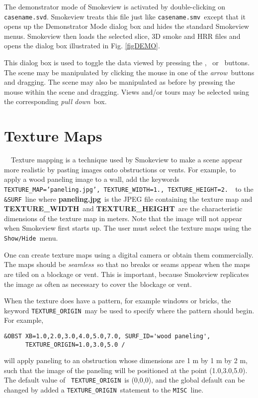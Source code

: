 \documentclass[11pt,twoside]{book}
\newcommand{\frameit}[1]{\fbox{\tt #1}}
\begin{document}
The demonstrator mode of Smokeview is activated by double-clicking on {\tt casename.svd}.
Smokeview treats this file just like {\tt casename.smv}\ except that it opens up
the Demonstrator Mode dialog box and hides the standard Smokeview menus.
Smokeview then
loads the selected slice, 3D smoke and HRR files and opens the dialog box illustrated in
Fig. \ref{figDEMO}.

This dialog box is used to toggle the data viewed by pressing the
\frameit{Smoke/Fire}, \frameit{Temperature}\ or \frameit{Oxygen}\
buttons. The scene may be manipulated by clicking the mouse in one
of the {\em arrow}\ buttons and dragging.  The scene may also be
manipulated as before by pressing the mouse within the scene and
dragging. Views and/or tours may be selected using the
corresponding {\em pull down}\ box.


\chapter{Texture Maps}\ \label{chapter:texturemaps}\ Texture mapping is a technique used by
Smokeview to make a scene appear more realistic by pasting images
onto obstructions or vents. For example, to apply a wood paneling
image to a wall, add the keywords {\tt
TEXTURE\_MAP='paneling.jpg', TEXTURE\_WIDTH=1., TEXTURE\_HEIGHT=2.
}\ to the {\tt \&SURF}\ line where {\bf paneling.jpg}\ is the JPEG
file containing the texture map and {\bf TEXTURE\_WIDTH}\ and {\bf
TEXTURE\_HEIGHT}\ are the characteristic dimensions of the texture
map in meters. Note that the image will not appear when Smokeview
first starts up. The user must select the texture maps using the
{\tt Show/Hide}\ menu.

One can create texture maps using a digital camera or obtain them
commercially.  The maps should be {\em seamless}\ so that no
breaks or seams appear when the maps are tiled on a blockage or
vent.  This is important, because Smokeview replicates the image
as often as necessary to cover the blockage or vent.

When the texture does have a pattern, for example windows or
bricks, the keyword {\tt TEXTURE\_ORIGIN}\ may be used to specify
where the pattern should begin.  For example,
\begin{lstlisting}
&OBST XB=1.0,2.0,3.0,4.0,5.0,7.0, SURF_ID='wood paneling',
      TEXTURE_ORIGIN=1.0,3.0,5.0 /
\end{lstlisting}
\noindent will apply paneling to an obstruction whose dimensions
are 1 m by 1 m by 2 m, such that the image of the paneling will be
positioned at the point (1.0,3.0,5.0). The default value of {\tt
TEXTURE\_ORIGIN}\ is (0,0,0), and the global default can be changed
by added a {\tt TEXTURE\_ORIGIN}\ statement to the {\tt MISC}\ line.
\end{document}
